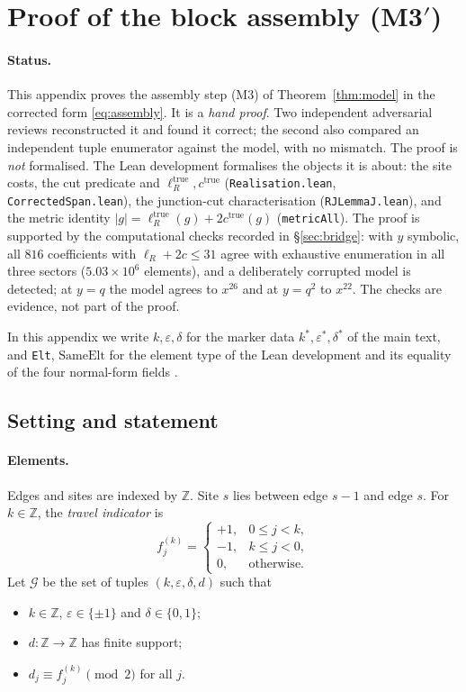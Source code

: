 \documentclass[11pt]{article}
\theoremstyle{plain}
\theoremstyle{definition}
\theoremstyle{remark}
\begin{document}
\section{Proof of the block assembly \textup{(M3$'$)}}\label{app:M3prime}

\paragraph{Status.}
This appendix proves the assembly step \textup{(M3)} of Theorem~\ref{thm:model} in the corrected form
\eqref{eq:assembly}. It is a \emph{hand proof}. Two independent adversarial reviews reconstructed it
and found it correct; the second also compared an independent tuple enumerator against the
model, with no mismatch. The proof is \emph{not} formalised. The Lean development formalises the
objects it is about: the site costs, the cut predicate and
$\ell_R^{\mathrm{true}},c^{\mathrm{true}}$ (\texttt{Realisation.lean},
\texttt{CorrectedSpan.lean}), the junction-cut characterisation (\texttt{RJLemmaJ.lean}), and
the metric identity $|g|=\ell_R^{\mathrm{true}}(g)+2c^{\mathrm{true}}(g)$
(\texttt{metricAll}). The proof is supported by the computational checks recorded in
\S\ref{sec:bridge}: with $y$ symbolic, all $816$ coefficients with $\ell_R+2c\le31$ agree with
exhaustive enumeration in all three sectors ($5.03\times10^6$ elements), and a deliberately
corrupted model is detected; at $y=q$ the model agrees to $x^{26}$ and at $y=q^2$ to $x^{22}$. The
checks are evidence, not part of the proof.

In this appendix we write $k,\varepsilon,\delta$ for the marker data $k^\ast,\varepsilon^\ast,\delta^\ast$
of the main text, and \texttt{Elt}, $\mathrm{SameElt}$ for the element type of the Lean development
and its equality of the four normal-form fields
\cite[Theorem ``Normal form and lamp model'', \textup{thm:normal-form}]{Bonfioli2026a}.

\subsection{Setting and statement}

\paragraph{Elements.}
Edges and sites are indexed by $\mathbb Z$. Site $s$ lies between edge $s-1$ and edge $s$.
For $k\in\mathbb Z$, the \emph{travel indicator} is
\[
  f^{(k)}_j=\begin{cases}+1,&0\le j<k,\\-1,&k\le j<0,\\0,&\text{otherwise.}\end{cases}
\]
Let $\mathcal G$ be the set of tuples $(k,\varepsilon,\delta,d)$ such that
\begin{itemize}
\item $k\in\mathbb Z$, $\varepsilon\in\{\pm1\}$ and $\delta\in\{0,1\}$;
\item $d:\mathbb Z\to\mathbb Z$ has finite support;
\item $d_j\equiv f^{(k)}_j\pmod 2$ for all $j$.
\end{itemize}
\end{document}
